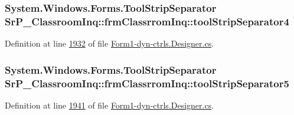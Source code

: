\hypertarget{class_sr_p___classroom_inq_1_1frm_classrrom_inq_a4b694b6ce3670642d724af5e79c46031}{
\subsubsection[{tool\-Strip\-Separator4}]{\setlength{\rightskip}{0pt plus 5cm}\-System.\-Windows.\-Forms.\-Tool\-Strip\-Separator {\bf \-Sr\-P\-\_\-\-Classroom\-Inq\-::frm\-Classrrom\-Inq\-::tool\-Strip\-Separator4}}}
\label{class_sr_p___classroom_inq_1_1frm_classrrom_inq_a4b694b6ce3670642d724af5e79c46031}


\-Definition at line \hyperlink{_form1-dyn-ctrls_8_designer_8cs_source_l01932}{1932} of file \hyperlink{_form1-dyn-ctrls_8_designer_8cs_source}{\-Form1-\/dyn-\/ctrls.\-Designer.\-cs}.

\hypertarget{class_sr_p___classroom_inq_1_1frm_classrrom_inq_ae8424b2612bda51525d313c05df65bb0}{
\subsubsection[{tool\-Strip\-Separator5}]{\setlength{\rightskip}{0pt plus 5cm}\-System.\-Windows.\-Forms.\-Tool\-Strip\-Separator {\bf \-Sr\-P\-\_\-\-Classroom\-Inq\-::frm\-Classrrom\-Inq\-::tool\-Strip\-Separator5}}}
\label{class_sr_p___classroom_inq_1_1frm_classrrom_inq_ae8424b2612bda51525d313c05df65bb0}


\-Definition at line \hyperlink{_form1-dyn-ctrls_8_designer_8cs_source_l01941}{1941} of file \hyperlink{_form1-dyn-ctrls_8_designer_8cs_source}{\-Form1-\/dyn-\/ctrls.\-Designer.\-cs}.

